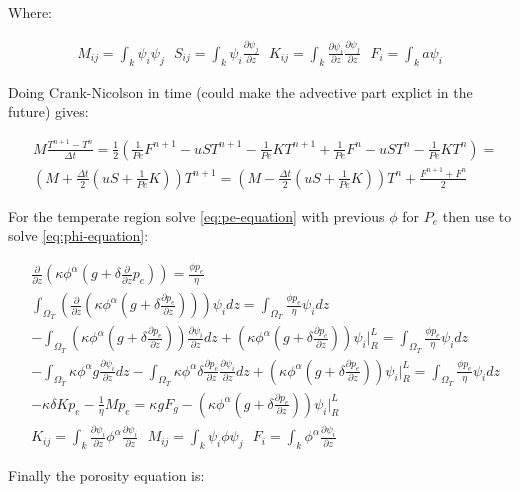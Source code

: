 \documentclass[a4paper,12pt]{article}
\newcommand{\pd}[2]{\frac{\partial #1}{\partial #2}}
\begin{document}
Where:

\begin{align*}
  M_{ij} = \int_k\psi_i\psi_j ~~~ S_{ij} = \int_k\psi_i\pd{\psi_j}{z} ~~~ K_{ij} = \int_k\pd{\psi_i}{z}\pd{\psi_j}{z} ~~~ F_i = \int_ka\psi_i
\end{align*}


Doing Crank-Nicolson in time (could make the advective part explict in the future) gives:

\begin{align*}
  & M\frac{T^{n+1} - T^n}{\Delta t}   = \frac{1}{2}\left(\frac{1}{Pe}F^{n+1} - uST^{n+1} - \frac{1}{Pe}KT^{n+1} +\frac{1}{Pe}F^n - uST^n - \frac{1}{Pe}KT^n\right) = \\
  & \left(M + \frac{\Delta t}{2}\left(uS + \frac{1}{Pe}K\right)\right)T^{n+1} = \left(M - \frac{\Delta t}{2}\left(uS + \frac{1}{Pe}K\right)\right)T^{n} + \frac{F^{n+1} + F^n}{2}
\end{align*}

For the temperate region solve \eqref{eq:pe-equation} with previous $\phi$ for $P_e$ then use to solve \eqref{eq:phi-equation}:

\begin{align*}
  &\pd{}{z}\left(\kappa\phi^\alpha\left(g + \delta\pd{}{z}p_e\right)\right) = \frac{\phi p_e}{\eta}\\
  &\int_{\Omega_T}\left(\pd{}{z}\left(\kappa\phi^\alpha\left(g + \delta\pd{p_e}{z}\right)\right)\right) \psi_i dz = \int_{\Omega_T}\frac{\phi p_e}{\eta}\psi_idz\\
  &-\int_{\Omega_T}\left(\kappa\phi^\alpha\left(g + \delta\pd{p_e}{z}\right)\right) \pd{\psi_i}{z} dz + \left(\kappa\phi^\alpha\left(g + \delta\pd{p_e}{z}\right)\right)\psi_i \bigg\rvert_R^L= \int_{\Omega_T}\frac{\phi p_e}{\eta}\psi_idz\\
  &-\int_{\Omega_T} \kappa\phi^\alpha g \pd{\psi_i}{z}dz -\int_{\Omega_T} \kappa\phi^\alpha\delta\pd{p_e}{z}\pd{\psi_i}{z}  dz + \left(\kappa\phi^\alpha\left(g + \delta\pd{p_e}{z}\right)\right)\psi_i \bigg\rvert_R^L= \int_{\Omega_T}\frac{\phi p_e}{\eta}\psi_idz\\
  &-\kappa \delta K p_e - \frac{1}{\eta}M p_e = \kappa g F_g - \left(\kappa\phi^\alpha\left(g + \delta\pd{p_e}{z}\right)\right)\psi_i \bigg\rvert_R^L\\
  & K_{ij} = \int_k\pd{\psi_i}{z}\phi^{\alpha}\pd{\psi_i}{z} ~~~ M_{ij} = \int_k \psi_i \phi \psi_j ~~~ F_i = \int_k \phi^{\alpha}\pd{\psi_i}{z}
\end{align*}

Finally the porosity equation is:
\end{document}
